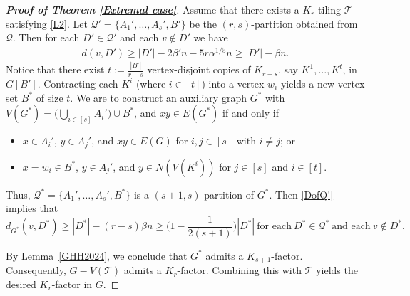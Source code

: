 \documentclass[11pt, a4paper]{article}
\theoremstyle{definition}
\newcommand{\<}{\subseteq}
\begin{document}
\begin{proof}[\bf Proof of Theorem \ref{Extremal case}]
Assume that there exists a $K_r$-tiling $\mathcal{T}$ satisfying \ref{L2}. Let $\mathcal{Q}'=        \{A_1',\ldots, A_s',B'\}$ be the $(r,s)$-partition obtained from $\mathcal{Q}$. Then for each $D'\in \mathcal{Q}'$ and each $v\notin D'$ we have 
\begin{align}\label{DofQ'}
d(v,D')\ge |D'|-2\beta'n -5r\alpha^{1/5}n\ge |D'|-\beta n.
\end{align}
Notice that there exist $t:=\frac{|B'|}{r-s}$ vertex-disjoint copies of $K_{r-s}$, say $K^1,\ldots,K^{t}$, in $G[B']$. Contracting each $K^i$ (where $i\in [t]$) into a vertex $w_i$ yields a new vertex set $B^*$ of size $t$. %
We are to construct an auxiliary graph $G^*$ with $V(G^*)=\big (\bigcup_{i\in[s]}A_i'\big)\cup B^*$, and $xy\in E(G^*)$ if and only if 
\begin{itemize}
    \item $x\in A_i'$, $y\in A_j'$, and $xy\in E(G)$ for $i,j\in[s]$ with $i\ne j$; or 
    \item $x=w_i\in B^*$, $y\in A_j'$, and $y\in N(V(K^i))$ for $j\in [s]$ and $i\in[t]$.%
\end{itemize}
Thus, $\mathcal{Q}^*=\{A_1',\ldots,A_s',B^*\}$ is a $(s+1,s)$-partition of $G^*$. %
Then  \eqref{DofQ'} implies that  %
$$
d_{G^*}(v,D^*)\geq |D^*|-(r-s)\beta n\geq \Big(1-\frac{1}{2(s+1)}\Big)|D^*| \ \text{for each}\ D^*\in \mathcal{Q}^* \ \text{and each}\ v\notin D^*.
$$

By Lemma~\ref{GHH2024}, we conclude that $G^*$ admits a  $K_{s+1}$-factor. Consequently,  $G-V(\mathcal{T})$ admits a $K_r$-factor. Combining this with $\mathcal{T}$ yields the desired $K_r$-factor in $G$. %
\end{proof}
\end{document}
